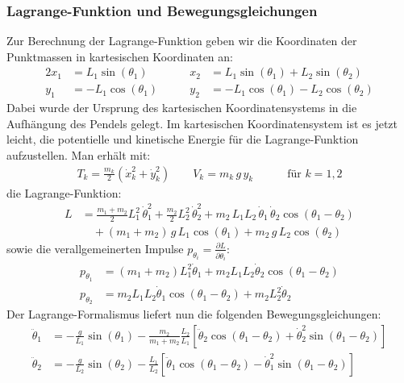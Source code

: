 \documentclass[10pt,a4paper]{article}
\begin{document}
\subsubsection{Lagrange-Funktion und Bewegungsgleichungen}
\label{sssec:Lagrange}
Zur Berechnung der Lagrange-Funktion geben wir die Koordinaten der Punktmassen in kartesischen Koordinaten an:
\begin{alignat*}{2}
x_1 &= L_1 \sin(\theta_1) &\qquad x_2 &= L_1 \sin(\theta_1) + L_2 \sin(\theta_2) \\
y_1 &= -L_1 \cos(\theta_1) &\qquad y_2 &= -L_1 \cos(\theta_1) - L_2 \cos(\theta_2)
\end{alignat*}
Dabei wurde der Ursprung des kartesischen Koordinatensystems in die Aufhängung des Pendels gelegt.
Im kartesischen Koordinatensystem ist es jetzt leicht, die potentielle und kinetische Energie für die Lagrange-Funktion aufzustellen. Man erhält mit:
\begin{align}
T_k = \frac{m_k}{2} \left( \dot{x}_k^2 + \dot{y}_k^2 \right) \qquad V_k = m_k \, g \, y_k \qquad \quad \text{für $k = 1, 2$}
\end{align}
die Lagrange-Funktion:
\begin{align}
L &= \frac{m_1 + m_2}{2} L_1^2 \, \dot{\theta}_1^2 + \frac{m_2}{2} L_2^2 \, \dot{\theta}_2^2 + m_2 \, L_1 L_2 \, \dot{\theta}_1 \, \dot{\theta}_2 \cos(\theta_1 - \theta_2) \nonumber \\
  &\quad {} + (m_1 + m_2) \, g \, L_1 \cos(\theta_1) + m_2 \, g \, L_2 \cos(\theta_2)
  \label{eq:lagrangian}
\end{align}
sowie die verallgemeinerten Impulse $p_{\theta_i} = \frac{\partial L}{\partial \dot{\theta}_i}$:
\begin{align}
  p_{\theta_1} &= (m_1 + m_2) L_1^2 \dot{\theta}_1 + m_2 L_1 L_2 \dot{\theta}_2 \cos(\theta_1 - \theta_2) \label{impuls1}\\
  p_{\theta_2} &= m_2 L_1 L_2 \dot{\theta}_1 \cos(\theta_1 - \theta_2) + m_2 L_2^2 \dot{\theta}_2 \label{impuls2}
\end{align}
Der Lagrange-Formalismus liefert nun die folgenden Bewegungsgleichungen:
\begin{align}
\ddot{\theta}_1 &= -\frac{g}{L_1} \sin(\theta_1) - \frac{m_2}{m_1+m_2} \frac{L_2}{L_1} \left[ \ddot{\theta}_2 \cos(\theta_1 - \theta_2) + \dot{\theta}_2^2 \sin(\theta_1 - \theta_2) \right] \label{eq:theta1gl}\\
\ddot{\theta}_2 &= -\frac{g}{L_2} \sin(\theta_2) - \frac{L_1}{L_2}\left[ \ddot{\theta}_1 \cos(\theta_1 - \theta_2) - \dot{\theta}_1^2 \sin(\theta_1 - \theta_2) \right] \label{eq:theta2gl}
\end{align}
\end{document}
